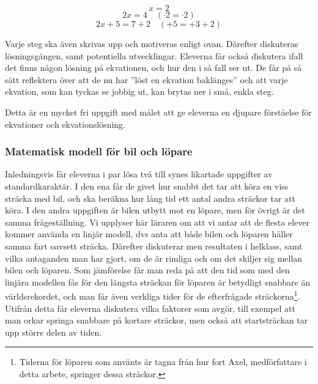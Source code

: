         \begin{equation*}
            x=2
        \end{equation*}
        \begin{equation*}
            2x=4 \quad (\cdot2=\cdot2)
        \end{equation*}
        \begin{equation*}
            2x+5=7+2 \quad (+5=+3+2)
        \end{equation*}
    
    \noindent\textcolor{lila}{Varje steg ska även skrivas upp och motiveras enligt ovan. Därefter diskuteras lösningsgången, samt potentiella utvecklingar. Eleverna får också diskutera ifall det finns någon lösning på ekvationen, och hur den i så fall ser ut. De får på så sätt reflektera över att de nu har ''löst en ekvation baklänges'' och att varje ekvation, som kan tyckas se jobbig ut, kan brytas ner i små, enkla steg.}
    
    \textcolor{lila}{Detta är en mycket fri uppgift med målet att ge eleverna en djupare förståelse för ekvationer och ekvationslösning.}

    

\subsubsection{Matematisk modell för bil och löpare}
    \label{sec:lopare}
    
    \textcolor{lila}{Inledningsvis får eleverna i par lösa två till synes likartade uppgifter av standardkaraktär. I den ena får de givet hur snabbt det tar att köra en viss sträcka med bil, och ska beräkna hur lång tid ett antal andra sträckor tar att köra. I den andra uppgiften är bilen utbytt mot en löpare, men för övrigt är det samma frågeställning. Vi upplyser här läraren om att vi antar att de flesta elever kommer använda en linjär modell, dvs anta att både bilen och löparen håller samma fart oavsett sträcka. Därefter diskuterar men resultaten i helklass, samt vilka antaganden man har gjort, om de är rimliga och om det skiljer sig mellan bilen och löparen. Som jämförelse får man reda på att den tid som med den linjära modellen fås för den längsta sträckan för löparen är betydligt snabbare än världsrekordet, och man får även verkliga tider för de efterfrågade sträckorna\footnote{Tiderna för löparen som använts är tagna från hur fort Axel, medförfattare i detta arbete, springer dessa sträckor.}. Utifrån detta får eleverna diskutera vilka faktorer som avgör, till exempel att man orkar springa snabbare på kortare sträckor, men också att startsträckan tar upp större delen av tiden. }
    
